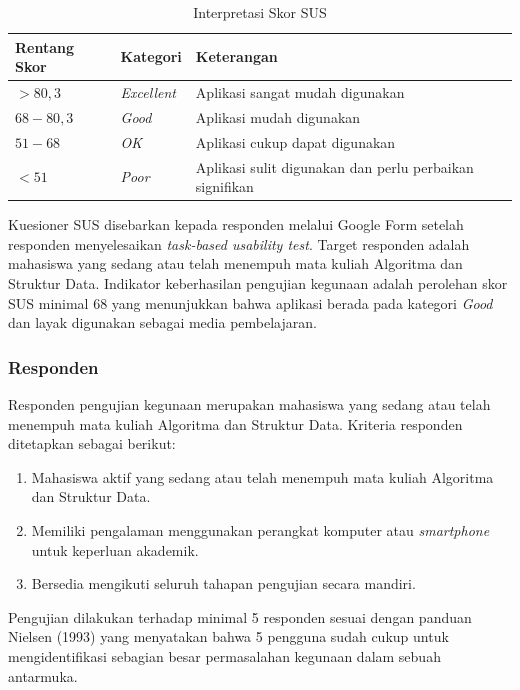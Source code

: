 \begin{table}[H]
\centering
\caption{Interpretasi Skor SUS}
\label{tab:sus}
\begin{tabular}{|L{3cm}|L{3cm}|L{6cm}|}
\hline
\textbf{Rentang Skor} & \textbf{Kategori} & \textbf{Keterangan} \\
\hline
$> 80{,}3$ & \textit{Excellent} & Aplikasi sangat mudah digunakan \\
\hline
$68 - 80{,}3$ & \textit{Good} & Aplikasi mudah digunakan \\
\hline
$51 - 68$ & \textit{OK} & Aplikasi cukup dapat digunakan \\
\hline
$< 51$ & \textit{Poor} & Aplikasi sulit digunakan dan perlu perbaikan signifikan \\
\hline
\end{tabular}
\end{table}

Kuesioner SUS disebarkan kepada responden melalui Google Form setelah responden menyelesaikan \textit{task-based usability test}. Target responden adalah mahasiswa yang sedang atau telah menempuh mata kuliah Algoritma dan Struktur Data. Indikator keberhasilan pengujian kegunaan adalah perolehan skor SUS minimal 68 yang menunjukkan bahwa aplikasi berada pada kategori \textit{Good} dan layak digunakan sebagai media pembelajaran.

\subsubsection{Responden}

Responden pengujian kegunaan merupakan mahasiswa yang sedang atau telah menempuh mata kuliah Algoritma dan Struktur Data. Kriteria responden ditetapkan sebagai berikut:

\begin{enumerate}
    \item Mahasiswa aktif yang sedang atau telah menempuh mata kuliah Algoritma dan Struktur Data.
    \item Memiliki pengalaman menggunakan perangkat komputer atau \textit{smartphone} untuk keperluan akademik.
    \item Bersedia mengikuti seluruh tahapan pengujian secara mandiri.
\end{enumerate}

Pengujian dilakukan terhadap minimal 5 responden sesuai dengan panduan Nielsen (1993) yang menyatakan bahwa 5 pengguna sudah cukup untuk mengidentifikasi sebagian besar permasalahan kegunaan dalam sebuah antarmuka.

